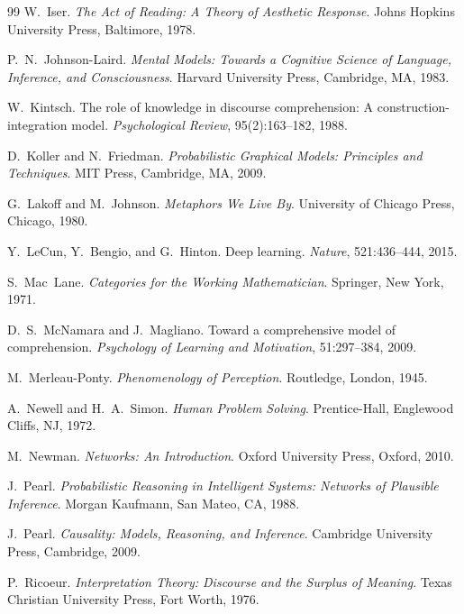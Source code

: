 \documentclass[12pt, a4paper]{article}
\begin{document}
\begin{thebibliography}{99}
W.~Iser.
\newblock \textit{The Act of Reading: A Theory of Aesthetic Response}.
\newblock Johns Hopkins University Press, Baltimore, 1978.

P.~N.~Johnson-Laird.
\newblock \textit{Mental Models: Towards a Cognitive Science of Language, Inference, and Consciousness}.
\newblock Harvard University Press, Cambridge, MA, 1983.

W.~Kintsch.
\newblock The role of knowledge in discourse comprehension: A construction-integration model.
\newblock \textit{Psychological Review}, 95(2):163--182, 1988.

D.~Koller and N.~Friedman.
\newblock \textit{Probabilistic Graphical Models: Principles and Techniques}.
\newblock MIT Press, Cambridge, MA, 2009.

G.~Lakoff and M.~Johnson.
\newblock \textit{Metaphors We Live By}.
\newblock University of Chicago Press, Chicago, 1980.

Y.~LeCun, Y.~Bengio, and G.~Hinton.
\newblock Deep learning.
\newblock \textit{Nature}, 521:436--444, 2015.

S.~Mac~Lane.
\newblock \textit{Categories for the Working Mathematician}.
\newblock Springer, New York, 1971.

D.~S.~McNamara and J.~Magliano.
\newblock Toward a comprehensive model of comprehension.
\newblock \textit{Psychology of Learning and Motivation}, 51:297--384, 2009.

M.~Merleau-Ponty.
\newblock \textit{Phenomenology of Perception}.
\newblock Routledge, London, 1945.

A.~Newell and H.~A.~Simon.
\newblock \textit{Human Problem Solving}.
\newblock Prentice-Hall, Englewood Cliffs, NJ, 1972.

M.~Newman.
\newblock \textit{Networks: An Introduction}.
\newblock Oxford University Press, Oxford, 2010.

J.~Pearl.
\newblock \textit{Probabilistic Reasoning in Intelligent Systems: Networks of Plausible Inference}.
\newblock Morgan Kaufmann, San Mateo, CA, 1988.

J.~Pearl.
\newblock \textit{Causality: Models, Reasoning, and Inference}.
\newblock Cambridge University Press, Cambridge, 2009.

P.~Ricoeur.
\newblock \textit{Interpretation Theory: Discourse and the Surplus of Meaning}.
\newblock Texas Christian University Press, Fort Worth, 1976.


\end{thebibliography}
\end{document}
